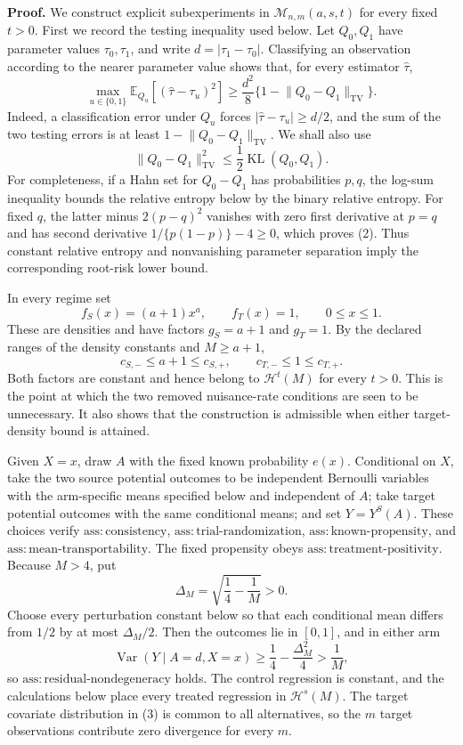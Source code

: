 \textbf{Proof.}
We construct explicit subexperiments in \(\mathcal M_{n,m}(a,s,t)\) for every fixed \(t>0\). First we record the testing inequality used below. Let \(Q_0,Q_1\) have parameter values \(\tau_0,\tau_1\), and write \(d=|\tau_1-\tau_0|\). Classifying an observation according to the nearer parameter value shows that, for every estimator \(\widehat\tau\),
\[
 \max_{u\in\{0,1\}}\mathbb E_{Q_u}
       [ (\widehat\tau-\tau_u)^2 ]
 \ge \frac{d^2}{8}
       \{1-\lVert Q_0-Q_1\rVert_{\mathrm{TV}}\}.
\tag{1}
\]
Indeed, a classification error under \(Q_u\) forces \(|\widehat\tau-\tau_u|\ge d/2\), and the sum of the two testing errors is at least \(1-\lVert Q_0-Q_1\rVert_{\mathrm{TV}}\). We shall also use
\[
 \lVert Q_0-Q_1\rVert_{\mathrm{TV}}^2
 \le \frac12\operatorname{KL}(Q_0,Q_1).
\tag{2}
\]
For completeness, if a Hahn set for \(Q_0-Q_1\) has probabilities \(p,q\), the log-sum inequality bounds the relative entropy below by the binary relative entropy. For fixed \(q\), the latter minus \(2(p-q)^2\) vanishes with zero first derivative at \(p=q\) and has second derivative \(1/\{p(1-p)\}-4\ge0\), which proves (2). Thus constant relative entropy and nonvanishing parameter separation imply the corresponding root-risk lower bound.

In every regime set
\[
 f_S(x)=(a+1)x^a,
 \qquad f_T(x)=1,
 \qquad 0\le x\le1.
\tag{3}
\]
These are densities and have factors \(g_S=a+1\) and \(g_T=1\). By the declared ranges of the density constants and \(M\ge a+1\),
\[
 c_{S,-}\le a+1\le c_{S,+},
 \qquad c_{T,-}\le1\le c_{T,+}.
\tag{4}
\]
Both factors are constant and hence belong to \(\mathcal H^t(M)\) for every \(t>0\). This is the point at which the two removed nuisance-rate conditions are seen to be unnecessary. It also shows that the construction is admissible when either target-density bound is attained.

Given \(X=x\), draw \(A\) with the fixed known probability \(e(x)\). Conditional on \(X\), take the two source potential outcomes to be independent Bernoulli variables with the arm-specific means specified below and independent of \(A\); take target potential outcomes with the same conditional means; and set \(Y=Y^S(A)\). These choices verify \(\mathrm{ass:consistency}\), \(\mathrm{ass:trial\text{-}randomization}\), \(\mathrm{ass:known\text{-}propensity}\), and \(\mathrm{ass:mean\text{-}transportability}\). The fixed propensity obeys \(\mathrm{ass:treatment\text{-}positivity}\). Because \(M>4\), put
\[
 \Delta_M=\sqrt{\frac14-\frac1M}>0.
\]
Choose every perturbation constant below so that each conditional mean differs from \(1/2\) by at most \(\Delta_M/2\). Then the outcomes lie in \([0,1]\), and in either arm
\[
 \operatorname{Var}(Y\mid A=d,X=x)
 \ge \frac14-\frac{\Delta_M^2}{4}
 >\frac1M,
\tag{5}
\]
so \(\mathrm{ass:residual\text{-}nondegeneracy}\) holds. The control regression is constant, and the calculations below place every treated regression in \(\mathcal H^s(M)\). The target covariate distribution in (3) is common to all alternatives, so the \(m\) target observations contribute zero divergence for every \(m\).

